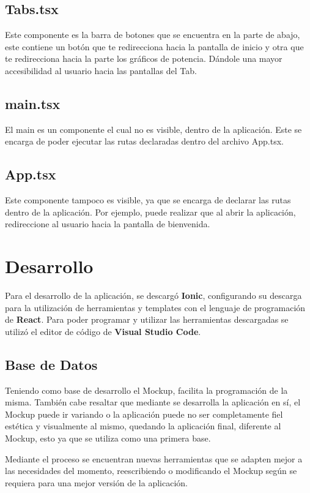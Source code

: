             \subsection{Tabs.tsx}
                Este componente es la barra de botones que se encuentra en la parte de abajo, este contiene un botón que te redirecciona hacia la pantalla de inicio y otra que te redirecciona hacia la parte los gráficos de potencia. Dándole una mayor accesibilidad al usuario hacia las pantallas del Tab.\par

            \subsection{main.tsx}
                El main es un componente el cual no es visible, dentro de la aplicación. Este se encarga de poder ejecutar las rutas declaradas dentro del archivo App.tsx.\par

            \subsection{App.tsx}
                Este componente tampoco es visible, ya que se encarga de declarar las rutas dentro de la aplicación. Por ejemplo, puede realizar que al abrir la aplicación, redireccione al usuario hacia la pantalla de bienvenida.\par
                
        \section{Desarrollo}
            Para el desarrollo de la aplicación, se descargó \textbf{Ionic}, configurando su descarga para la utilización de herramientas y templates con el lenguaje de programación de \textbf{React}. Para poder programar y utilizar las herramientas descargadas se utilizó el editor de código de \textbf{Visual Studio Code}.\par 
            \subsection{Base de Datos}
                Teniendo como base de desarrollo el Mockup, facilita la programación de la misma. También cabe resaltar que mediante se desarrolla la aplicación en sí, el Mockup puede ir variando o la aplicación puede no ser completamente fiel estética y visualmente al mismo, quedando la aplicación final, diferente al Mockup, esto ya que se utiliza como una primera base.\par 
                Mediante el proceso se encuentran nuevas herramientas que se adapten mejor a las necesidades del momento, reescribiendo o modificando el Mockup según se requiera para una mejor versión de la aplicación.\par
